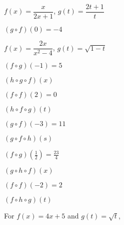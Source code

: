 \documentclass{ximera}
\begin{document}
\begin{question}
$f(x) = \dfrac{x}{2x+1}$, $g(t) = \dfrac{2t+1}{t}$
\begin{solution}
$(g\circ f)(0) = -4$
\end{solution}

\end{question}

\begin{question}
$f(x) =  \dfrac{2x}{x^2-4}$, $g(t) =\sqrt{1-t}$ 
 

\begin{solution}
$(f\circ g)(-1) = 5$
\end{solution}

\end{question}

\begin{question}
$(h\circ g \circ f)(x)$
\begin{solution}
$(f \circ f)(2) = 0$








\end{solution}

\end{question}

\begin{question}
$(h\circ f \circ g)(t)$
\begin{solution}
$(g\circ f)(-3) = 11$
\end{solution}

\end{question}

\begin{question}
$(g\circ f \circ h)(s)$

\begin{solution}
$(f\circ g)\left(\frac{1}{2}\right) = \frac{23}{4}$
\end{solution}

\end{question}

\begin{question}
$(g\circ h \circ f)(x)$
\begin{solution}
$(f \circ f)(-2) = 2$


\end{solution}

\end{question}

\begin{question}
$(f\circ h \circ g)(t)$
\begin{solution}
For $f(x) = 4x+5$ and $g(t) = \sqrt{t}$,



\end{solution}

\end{question}
\end{document}
